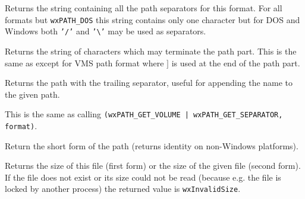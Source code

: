 


\label{wxfilenamegetpathseparators}


Returns the string containing all the path separators for this format. For all
formats but {\tt wxPATH\_DOS} this string contains only one character but for
DOS and Windows both {\tt '/'} and {\tt '\textbackslash'} may be used as
separators.




\label{wxfilenamegetpathterminators}


Returns the string of characters which may terminate the path part. This is the
same as  except for VMS
path format where $]$ is used at the end of the path part.


\label{wxfilenamegetpathwithsep}


Returns the path with the trailing separator, useful for appending the name to
the given path.

This is the same as calling 
\texttt{(wxPATH\_GET\_VOLUME | wxPATH\_GET\_SEPARATOR, format)}.


\label{wxfilenamegetshortpath}


Return the short form of the path (returns identity on non-Windows platforms).


\label{wxfilenamegetsize}



Returns the size of this file (first form) or the size of the given file (second form).
If the file does not exist or its size could not be read (because e.g. the file is locked
by another process) the returned value is {\tt wxInvalidSize}.


